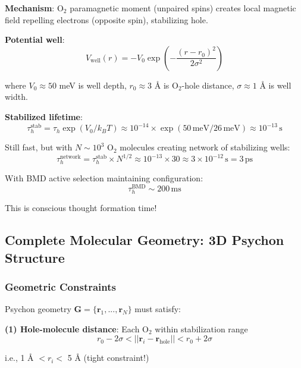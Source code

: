 \documentclass[11pt,onecolumn]{article}
\begin{document}
\textbf{Mechanism}: O$_2$ paramagnetic moment (unpaired spins) creates local magnetic field repelling electrons (opposite spin), stabilizing hole.

\textbf{Potential well}:
\begin{equation}
V_{\text{well}}(r) = -V_0 \exp\left(-\frac{(r - r_0)^2}{2\sigma^2}\right)
\end{equation}

where $V_0 \approx 50$ meV is well depth, $r_0 \approx 3$ Å is O$_2$-hole distance, $\sigma \approx 1$ Å is well width.

\textbf{Stabilized lifetime}:
\begin{equation}
\tau_h^{\text{stab}} = \tau_h \exp(V_0 / k_B T) \approx 10^{-14} \times \exp(50\,\text{meV} / 26\,\text{meV}) \approx 10^{-13}\,\text{s}
\end{equation}

Still fast, but with $N \sim 10^3$ O$_2$ molecules creating network of stabilizing wells:
\begin{equation}
\tau_h^{\text{network}} = \tau_h^{\text{stab}} \times N^{1/2} \approx 10^{-13} \times 30 \approx 3 \times 10^{-12}\,\text{s} = 3\,\text{ps}
\end{equation}

With BMD active selection maintaining configuration:
\begin{equation}
\tau_h^{\text{BMD}} \sim 200\,\text{ms}
\end{equation}

This is conscious thought formation time!

\subsection{Complete Molecular Geometry: 3D Psychon Structure}

\subsubsection{Geometric Constraints}

Psychon geometry $\mathbf{G} = \{\mathbf{r}_1, ..., \mathbf{r}_N\}$ must satisfy:

\textbf{(1) Hole-molecule distance}: Each O$_2$ within stabilization range
\begin{equation}
r_{0} - 2\sigma < ||\mathbf{r}_i - \mathbf{r}_{\text{hole}}|| < r_0 + 2\sigma
\end{equation}

i.e., 1 Å $< r_i <$ 5 Å (tight constraint!)
\end{document}
